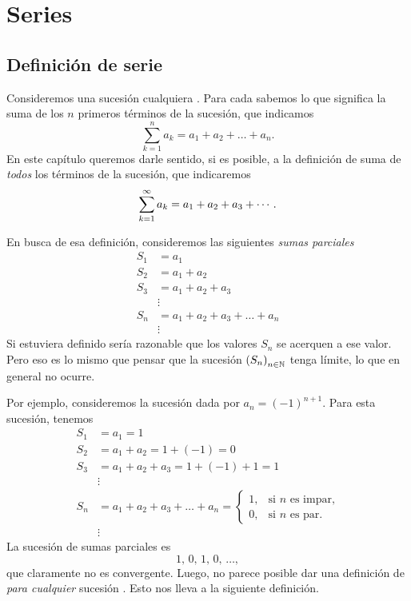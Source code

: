 \chapter{Series}

\section{Definición de serie}

Consideremos una sucesión cualquiera \sucan. Para cada \niN sabemos lo que significa la suma de los $n$ primeros términos de la sucesión, que indicamos
\[
\sum_{k=1}^n a_k = a_1+a_2+\dots+a_n.
\]
En este capítulo queremos darle sentido, si es posible, a la definición de suma de \emph{todos} los términos de la sucesión, que indicaremos
\[
\sum_{k=1}^\infty a_k = a_1+a_2 +a_3+\cdots.
\]

En busca de esa definición, consideremos las siguientes \emph{sumas parciales}
\begin{align*}
    S_1 &= a_1 \\
    S_2 &= a_1 + a_2 \\
    S_3 &= a_1 + a_2 + a_3\\
    &\vdots \\
    S_n &= a_1 + a_2 + a_3 + \dots + a_n \\
    &\vdots 
\end{align*}
Si estuviera definido \serieak sería razonable que los valores $S_n$ se acerquen a ese valor. Pero eso es lo mismo que pensar que la sucesión $\left(S_n\right)_{n\in\mathbb{N}}$ tenga límite, lo que en general no ocurre.

Por ejemplo, consideremos la sucesión dada por $a_n = (-1)^{n+1}$.
Para esta sucesión, tenemos
\begin{align*}
    S_1 &= a_1 = 1\\
    S_2 &= a_1 + a_2 = 1 + (-1) = 0\\
    S_3 &= a_1 + a_2 + a_3 = 1 + (-1) + 1 = 1\\
    &\vdots \\
    S_n &= a_1 + a_2 + a_3 + \dots + a_n = \begin{cases} 1, &\text{si $n$ es impar,}\\
    0, &\text{si $n$ es par}. 
    \end{cases}
    \\
    &\vdots 
\end{align*}
La sucesión de sumas parciales es
\[ 
1,\,0,\,1,\,0,\,\dots, 
\]
que claramente no es convergente.
Luego, no parece posible dar una definición de \serieak \emph{para cualquier} sucesión \sucan. 
Esto nos lleva a la siguiente definición.

